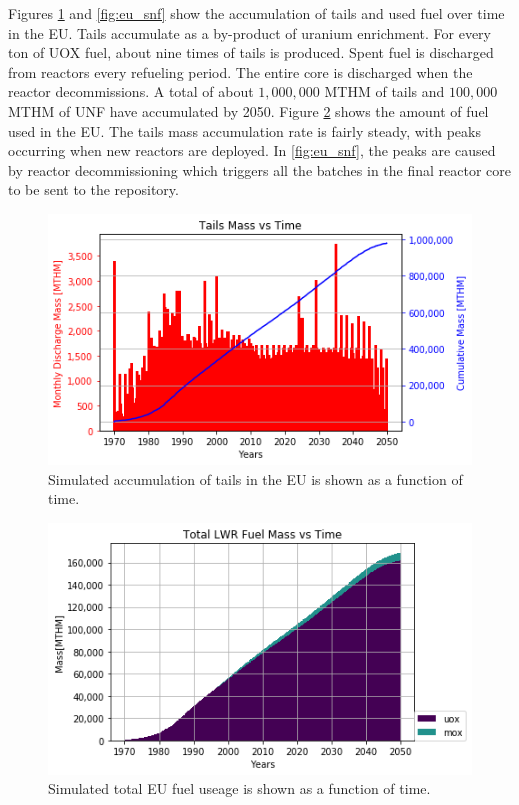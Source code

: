 Figures \ref{fig:eu_tail} and \ref{fig:eu_snf} show the 
accumulation of tails and used fuel over time in the \gls{EU}.
Tails accumulate as a by-product of uranium enrichment. For every
ton of \gls{UOX} fuel, about nine times of tails is produced. 
Spent fuel is discharged from reactors every refueling period.
The entire core is discharged when the reactor decommissions.
A total of about $1,000,000$ MTHM of tails and $100,000$ MTHM of
\gls{UNF} have accumulated by 2050.
Figure \ref{fig:eu_fuel} shows the amount of fuel used in the \gls{EU}. The 
tails mass accumulation rate is fairly steady, with peaks occurring when new 
reactors are deployed.
In \cref{fig:eu_snf}, the peaks are caused by reactor decommissioning which 
triggers all the batches in the final reactor core to be sent to the repository.

\begin{figure}[htbp!]
	\begin{center}
		\includegraphics[scale=0.7]{./images/eu_future/tails.png}
	\end{center}
        \caption{Simulated accumulation of tails in the \gls{EU} is shown as a function of time.}
	\label{fig:eu_tail}
\end{figure}

\begin{figure}[htbp!]
	\begin{center}
		\includegraphics[scale=0.7]{./images/eu_future/total_fuel.png}
	\end{center}
\caption{Simulated total \gls{EU} fuel useage is shown as a function of time.}
	\label{fig:eu_fuel}
\end{figure}


